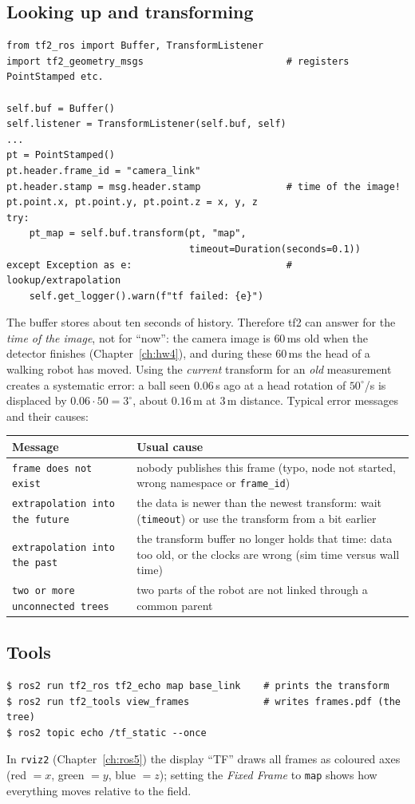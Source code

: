 \subsection*{Looking up and transforming}
\begin{verbatim}
from tf2_ros import Buffer, TransformListener
import tf2_geometry_msgs                         # registers PointStamped etc.

self.buf = Buffer()
self.listener = TransformListener(self.buf, self)
...
pt = PointStamped()
pt.header.frame_id = "camera_link"
pt.header.stamp = msg.header.stamp               # time of the image!
pt.point.x, pt.point.y, pt.point.z = x, y, z
try:
    pt_map = self.buf.transform(pt, "map",
                                timeout=Duration(seconds=0.1))
except Exception as e:                           # lookup/extrapolation
    self.get_logger().warn(f"tf failed: {e}")
\end{verbatim}
The buffer stores about ten seconds of history. Therefore tf2 can answer for the \emph{time of the image}, not for ``now'': the camera image is $60$\,ms old when the detector finishes (Chapter~\ref{ch:hw4}), and during these $60$\,ms the head of a walking robot has moved. Using the \emph{current} transform for an \emph{old} measurement creates a systematic error: a ball seen $0.06$\,s ago at a head rotation of $50^\circ$/s is displaced by $0.06\cdot50=3^\circ$, about $0.16$\,m at $3$\,m distance. Typical error messages and their causes:
\begin{center}
\renewcommand{\arraystretch}{1.25}
\begin{tabular}{p{5.2cm}p{7.4cm}}
\textbf{Message} & \textbf{Usual cause}\\ \hline
\verb!frame does not exist! & nobody publishes this frame (typo, node not started, wrong namespace or \verb!frame_id!)\\
\verb!extrapolation into the future! & the data is newer than the newest transform: wait (\verb!timeout!) or use the transform from a bit earlier\\
\verb!extrapolation into the past! & the transform buffer no longer holds that time: data too old, or the clocks are wrong (sim time versus wall time)\\
\verb!two or more unconnected trees! & two parts of the robot are not linked through a common parent\\
\end{tabular}
\end{center}
\subsection*{Tools}
\begin{verbatim}
$ ros2 run tf2_ros tf2_echo map base_link    # prints the transform
$ ros2 run tf2_tools view_frames             # writes frames.pdf (the tree)
$ ros2 topic echo /tf_static --once
\end{verbatim}
In \verb!rviz2! (Chapter~\ref{ch:ros5}) the display ``TF'' draws all frames as coloured axes (red $=x$, green $=y$, blue $=z$); setting the \emph{Fixed Frame} to \verb!map! shows how everything moves relative to the field.

